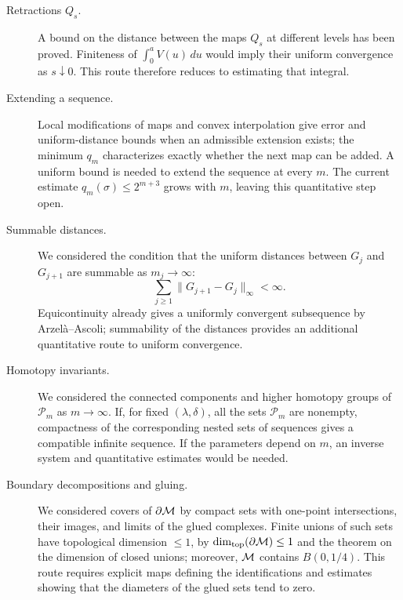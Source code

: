 \begin{description}
\item[Retractions \(Q_s\).] A bound on the distance between the maps
\(Q_s\) at different levels has been proved. Finiteness of
\(\int_0^aV(u)\,du\) would imply their uniform convergence as
\(s\downarrow0\). This route therefore reduces to estimating that
integral.

\item[Extending a sequence.] Local modifications of maps and convex
interpolation give error and uniform-distance bounds when an
admissible extension exists; the minimum \(q_m\) characterizes exactly
whether the next map can be added. A uniform bound is needed to extend
the sequence at every \(m\). The current estimate
\(q_m(\sigma)\le2^{m+3}\) grows with \(m\), leaving this quantitative
step open.

\item[Summable distances.] We considered the condition that the uniform
distances between \(G_j\) and \(G_{j+1}\) are summable as
\(m_j\to\infty\):
\[
 \sum_{j\ge1}\|G_{j+1}-G_j\|_\infty<\infty.
\]
Equicontinuity already gives a uniformly convergent subsequence by
Arzelà--Ascoli; summability of the distances provides an additional
quantitative route to uniform convergence.

\item[Homotopy invariants.] We considered the connected components and
higher homotopy groups of \(\mathcal P_m\) as \(m\to\infty\). If, for
fixed \((\lambda,\delta)\), all the sets
\(\mathcal P_m\) are nonempty, compactness of the corresponding
nested sets of sequences gives a compatible infinite sequence. If
the parameters depend on \(m\), an inverse system and quantitative
estimates would be needed.

\item[Boundary decompositions and gluing.]
We considered covers of \(\partial\mathcal M\) by compact sets with
one-point intersections, their images, and limits of the glued
complexes. Finite unions of such sets have topological dimension
\(\le1\), by \(\dim_{\mathrm{top}}(\partial\mathcal M)\le1\)
\cite{HurewiczWallman} and the theorem on the dimension of closed
unions; moreover, \(\mathcal M\) contains \(B(0,1/4)\). This route requires
explicit maps defining the identifications and estimates showing that
the diameters of the glued sets tend to zero.
\end{description}
